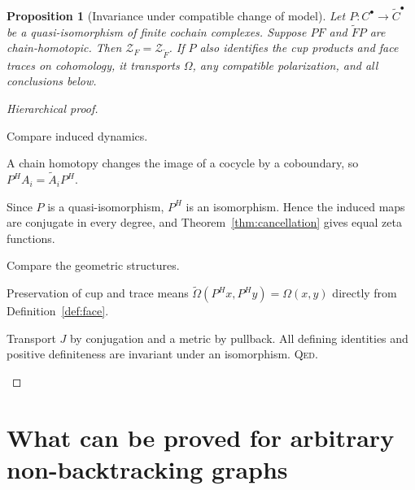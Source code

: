 \documentclass[11pt,a4paper]{article}
\newtheorem{proposition}[definition]{Proposition}
\theoremstyle{remark}\newtheorem{remark}[definition]{Remark}
\newcommand{\QED}{\textsc{Qed}}
\begin{document}
\begin{proposition}[Invariance under compatible change of model]\label{prop:model}
Let $P:C^\bullet\to\widetilde C^\bullet$ be a quasi-isomorphism of finite cochain complexes. Suppose $PF$ and $\widetilde FP$ are chain-homotopic. Then $\mathcal Z_F=\mathcal Z_{\widetilde F}$. If $P$ also identifies the cup products and face traces on cohomology, it transports $\Omega$, any compatible polarization, and all conclusions below.
\end{proposition}
\begin{proof}[Hierarchical proof]
\begin{steps}
\item Compare induced dynamics.
\begin{steps}
\item A chain homotopy changes the image of a cocycle by a coboundary, so $P^HA_i=\widetilde A_iP^H$.
\item Since $P$ is a quasi-isomorphism, $P^H$ is an isomorphism. Hence the induced maps are conjugate in every degree, and Theorem~\ref{thm:cancellation} gives equal zeta functions.
\end{steps}
\item Compare the geometric structures.
\begin{steps}
\item Preservation of cup and trace means $\widetilde\Omega(P^Hx,P^Hy)=\Omega(x,y)$ directly from Definition~\ref{def:face}.
\item Transport $J$ by conjugation and a metric by pullback. All defining identities and positive definiteness are invariant under an isomorphism. \QED.
\end{steps}
\end{steps}
\end{proof}

\section{What can be proved for arbitrary non-backtracking graphs}
\end{document}

